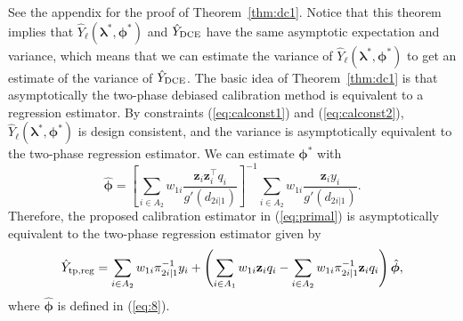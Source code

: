 \documentclass[12pt]{article}
\renewcommand{\bf}[1]{\mathbf{#1}}
\begin{document}
See the appendix for the proof of Theorem~\ref{thm:dc1}. Notice that this
theorem implies
that $\hat Y_{\ell}(\bm \lambda^*, \bm \phi^*)$ and $\hat Y_{\rm DCE}$ have
the same asymptotic expectation and variance, 
which means that we can estimate
the variance of $\hat Y_{\ell}(\bm \lambda^*, \bm \phi^*)$ to get an
estimate of the variance of $\hat Y_{\rm DCE}$. The basic idea of 
Theorem~\ref{thm:dc1} is that asymptotically the two-phase debiased calibration
method is equivalent to a regression estimator. By constraints 
(\ref{eq:calconst1}) and (\ref{eq:calconst2}), 
$\hat Y_{\ell}(\bm \lambda^*, \bm \phi^*)$ is design consistent, and the
variance is asymptotically equivalent to the two-phase regression estimator. 
We can estimate $\bm \phi^*$ with
\begin{equation}
\hat{\bm \phi} = 
\left[\sum_{i \in A_2} 
w_{1i}\frac{\bf z_i \bf z_i^\top q_i}{g'(d_{2i|1})}\right]^{-1}
\sum_{i \in A_2} w_{1i}\frac{\bf z_i y_i}{g'(d_{2i|1})}.
\label{eq:8}
\end{equation}
Therefore, the proposed calibration estimator in (\ref{eq:primal}) is
asymptotically equivalent to the two-phase regression estimator given by 
  $$
  \hat Y_{\rm tp, reg}  = 
  \sum_{i \in A_2} w_{1i} \pi_{2i|1}^{-1} y_i
  + \left(\sum_{i \in A_1} w_{1i} \bf z_i q_i - 
  \sum_{i \in A_2} w_{1i} \pi_{2i|1}^{-1} \bf{z}_i q_i\right)\hat{\bm \phi},
  $$
where $\hat{\bm \phi}$ is defined in (\ref{eq:8}). 
\end{document}
